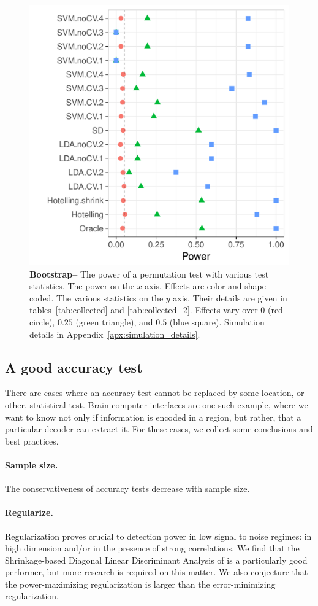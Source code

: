 \documentclass[12pt,a4paper]{article}
\begin{document}
\begin{figure}[ht]
	\centering
	\includegraphics[width=0.7\linewidth]{"art/file13"}
	\caption{
		\textbf{Bootstrap--}
		The power of a permutation test with various test statistics. 
		The power on the $x$ axis. 
		Effects are color and shape coded. 
		The various statistics on the $y$ axis. 
		Their details are given in tables~\ref{tab:collected} and \ref{tab:collected_2}. 
		Effects vary over $0$ (red circle), $0.25$ (green triangle), and $0.5$ (blue square). 
		Simulation details in Appendix~\ref{apx:simulation_details}.
	} 
	\label{fig:bootstrap}
\end{figure}




\subsection{A good accuracy test}
There are cases where an accuracy test cannot be replaced by some location, or other, statistical test. 
Brain-computer interfaces are one such example, where we want to know not only if information is encoded in a region, but rather, that a particular decoder can extract it. 
For these cases, we collect some conclusions and best practices. 


\paragraph{Sample size.} The conservativeness of accuracy tests decrease with sample size. 


\paragraph{Regularize.}
Regularization proves crucial to detection power in low signal to noise regimes: in high dimension and\slash or in the presence of strong correlations. 
We find that the Shrinkage-based Diagonal Linear Discriminant Analysis of \cite{pang_shrinkage-based_2009} is a particularly good performer, but more research is required on this matter. 
We also conjecture that the power-maximizing regularization is larger than the error-minimizing regularization.
\end{document}
